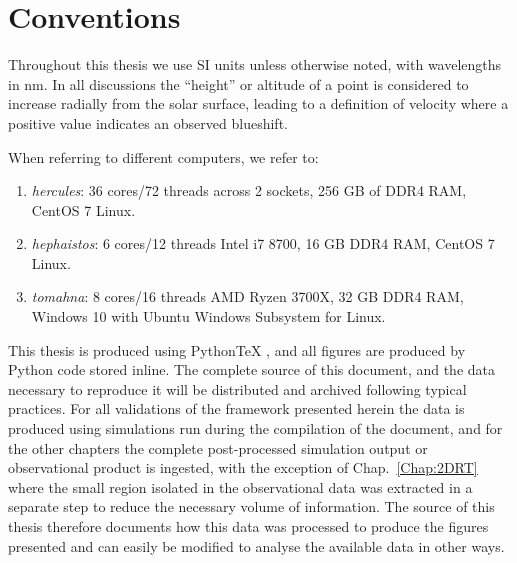 
\section{Conventions}

Throughout this thesis we use SI units unless otherwise noted, with wavelengths in \si{\nano\m}.
In all discussions the ``height'' or altitude of a point is considered to increase radially from the solar surface, leading to a definition of velocity where a positive value indicates an observed blueshift.

When referring to different computers, we refer to:
\begin{enumerate}
    \item \emph{hercules}: 36 cores/72 threads  across 2 sockets, 256 GB of DDR4 RAM, CentOS 7 Linux.
    \item \emph{hephaistos}: 6 cores/12 threads Intel i7 8700, 16 GB DDR4 RAM, CentOS 7 Linux.
    \item \emph{tomahna}: 8 cores/16 threads AMD Ryzen 3700X, 32 GB DDR4 RAM, Windows 10 with Ubuntu Windows Subsystem for Linux.
\end{enumerate}

This thesis is produced using PythonTeX \citep{Poore2015}, and all figures are produced by Python code stored inline.
The complete source of this document, and the data necessary to reproduce it will be distributed and archived following typical practices.
For all validations of the \Lw{} framework presented herein the data is produced using simulations run during the compilation of the document, and for the other chapters the complete post-processed simulation output or observational product is ingested, with the exception of Chap.~\ref{Chap:2DRT} where the small region isolated in the observational data was extracted in a separate step to reduce the necessary volume of information.
The source of this thesis therefore documents how this data was processed to produce the figures presented and can easily be modified to analyse the available data in other ways.

